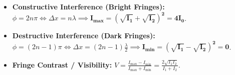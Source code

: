 \documentclass[10pt,twoside,openright]{book}
\begin{document}
\begin{conceptbox}
\begin{equation}
\end{equation}
\begin{itemize}
  \item \textbf{Constructive Interference (Bright Fringes):} $\phi = 2n\pi \iff \Delta x = n\lambda \implies \mathbf{I_{\max} = (\sqrt{I_1} + \sqrt{I_2})^2 = 4I_0}$.
  \item \textbf{Destructive Interference (Dark Fringes):} $\phi = (2n-1)\pi \iff \Delta x = (2n-1)\frac{\lambda}{2} \implies \mathbf{I_{\min} = (\sqrt{I_1} - \sqrt{I_2})^2 = 0}$.
  \item \textbf{Fringe Contrast / Visibility:} $V = \frac{I_{\max} - I_{\min}}{I_{\max} + I_{\min}} = \frac{2\sqrt{I_1 I_2}}{I_1 + I_2}$.
\end{itemize}
\end{conceptbox}
\end{document}
